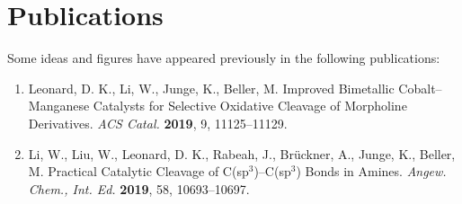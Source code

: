 

\chapter*{Publications} %

Some ideas and figures have appeared previously in the following publications:\\



\begin{enumerate}
    \item Leonard, D. K., Li, W., Junge, K., Beller, M. Improved Bimetallic Cobalt--Manganese Catalysts for Selective Oxidative Cleavage of Morpholine Derivatives. \textit{ACS Catal.} \textbf{2019}, 9, 11125--11129.
    \item Li, W., Liu, W., Leonard, D. K., Rabeah, J., Br\"uckner, A., Junge, K., Beller, M. Practical Catalytic Cleavage of C(sp$^3$)--C(sp$^3$) Bonds in Amines. \textit{Angew. Chem., Int. Ed.} \textbf{2019}, 58, 10693--10697.
\end{enumerate}

